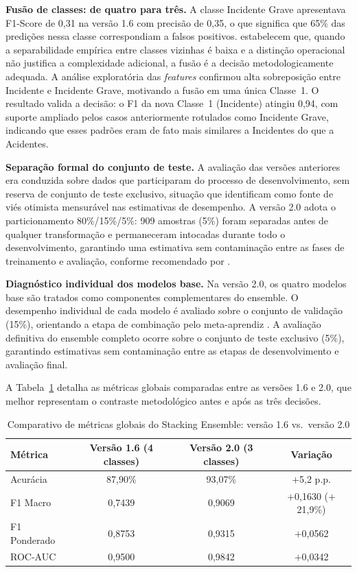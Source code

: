 \documentclass[english,brazilian]{UNISINOSartigo}
\begin{document}
\textbf{Fusão de classes: de quatro para três.}
A classe Incidente Grave apresentava F1-Score de 0,31 na versão 1.6
com precisão de 0,35, o que significa que 65\% das predições nessa classe
correspondiam a falsos positivos.
 estabelecem que, quando a separabilidade empírica entre classes
vizinhas é baixa e a distinção operacional não justifica a complexidade adicional,
a fusão é a decisão metodologicamente adequada.
A análise exploratória das \textit{features} confirmou alta sobreposição entre Incidente
e Incidente Grave, motivando a fusão em uma única Classe~1.
O resultado valida a decisão: o F1 da nova Classe~1 (Incidente) atingiu 0,94, com
suporte ampliado pelos casos anteriormente rotulados como Incidente Grave, indicando
que esses padrões eram de fato mais similares a Incidentes do que a Acidentes.

\textbf{Separação formal do conjunto de teste.}
A avaliação das versões anteriores era conduzida sobre dados que participaram do processo
de desenvolvimento, sem reserva de conjunto de teste exclusivo, situação que
 identificam como fonte de viés otimista mensurável nas
estimativas de desempenho.
A versão 2.0 adota o particionamento 80\%/15\%/5\%: 909 amostras (5\%) foram separadas
antes de qualquer transformação e permaneceram intocadas durante todo o desenvolvimento,
garantindo uma estimativa sem contaminação entre as fases de treinamento e avaliação,
conforme recomendado por .

\textbf{Diagnóstico individual dos modelos base.}
Na versão 2.0, os quatro modelos base são tratados como componentes complementares
do ensemble. O desempenho individual de cada modelo é avaliado sobre o conjunto de
validação (15\%), orientando a etapa de combinação pelo meta-aprendiz
\cite{WOLPERT1992}. A avaliação definitiva do ensemble completo ocorre sobre o
conjunto de teste exclusivo (5\%), garantindo estimativas sem contaminação entre
as etapas de desenvolvimento e avaliação final.

A Tabela~\ref{tab:comparativo} detalha as métricas globais comparadas entre as versões
1.6 e 2.0, que melhor representam o contraste metodológico antes e após as três decisões.

\begin{table}[ht]
  \caption{Comparativo de métricas globais do Stacking Ensemble: versão 1.6 vs.\ versão 2.0}
  \label{tab:comparativo}
  \centering
  \begin{tabular}{lccc}
    \toprule
    \textbf{Métrica} & \textbf{Versão 1.6 (4 classes)} & \textbf{Versão 2.0 (3 classes)} & \textbf{Variação} \\
    \midrule
    Acurácia     & 87,90\% & 93,07\% & $+$5,2 p.p.                  \\
    F1 Macro     & 0,7439  & 0,9069  & $+$0,1630 ($+$21,9\%)        \\
    F1 Ponderado & 0,8753  & 0,9315  & $+$0,0562                    \\
    ROC-AUC      & 0,9500  & 0,9842  & $+$0,0342                    \\
    \bottomrule
  \end{tabular}
\end{table}
\end{document}
